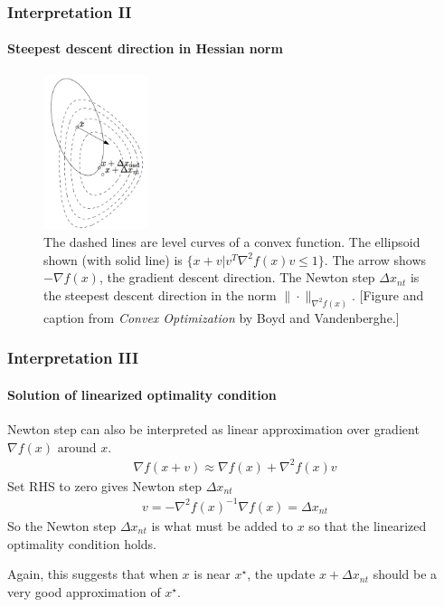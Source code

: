 \documentclass{beamer}
\begin{document}
\begin{frame}
\frametitle{Interpretation II}
\framesubtitle{Steepest descent direction in Hessian norm}
\begin{figure}
    \includegraphics[width=1.2in]{steepest.png}
\caption{ \footnotesize
The dashed lines are level curves of a convex function. The ellipsoid shown
(with solid line) is $\{x + v | v^T \nabla^2 f(x) v \leq 1\}$. The arrow shows
$-\nabla f(x)$, the gradient descent direction. The Newton step $\Delta x_{nt}$ is the
steepest descent direction in the norm $\|\cdot \|_{\nabla^2 f(x)}$. [Figure and caption from  \textit{Convex Optimization} by Boyd and Vandenberghe.] 
} 
\label{fig:2}
\end{figure}
\end{frame}
\begin{frame}
\frametitle{Interpretation III}
\framesubtitle{Solution of linearized optimality condition}
    Newton step can also be interpreted as 
    linear approximation over gradient $\nabla f(x)$ around $x$.
    \begin{align}
        \nabla f(x+v) \approx \nabla f(x) + \nabla^2 f(x) v
    \end{align}
    Set RHS to zero gives Newton step $\Delta x_{nt}$
    \begin{align}
        v = - \nabla^2 f(x)^{-1} \nabla f(x) = \Delta x_{nt} 
    \end{align}
    So the Newton step $\Delta x_{nt}$ is what must be added to $x$ so that
    the linearized optimality condition holds. 

    Again, this suggests that when $x$ is near $x^{\star}$, the update $x+\Delta
    x_{nt}$ should be a very good approximation of $x^{\star}$.
\end{frame}
\end{document}
